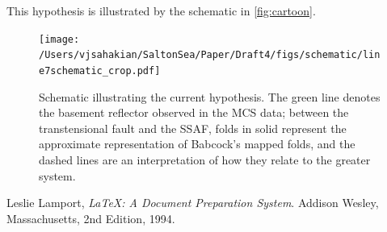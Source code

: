 \documentclass[fontsize=11pt, %
                             paper=a4, %
                             twoside, %
                             captions=tableheading,
                             index=totoc,
                             hyperref]{labbook}
\begin{document}
\begin{addmargin}[4cm]{0cm}
This hypothesis is illustrated by the schematic in \autoref{fig:cartoon}.

\begin{figure}[h!]
\raggedleft
\texttt{[image: /Users/vjsahakian/SaltonSea/Paper/Draft4/figs/schematic/line7schematic\_crop.pdf]}
\caption{Schematic illustrating the current hypothesis.  The green line denotes the basement reflector observed in the MCS data; between the transtensional fault and the SSAF, folds in solid represent the approximate representation of Babcock's mapped folds, and the dashed lines are an interpretation of how they relate to the greater system.}
\label{fig:cartoon}
\end{figure}
 
\end{addmargin}


\begin{thebibliography}{9}

Leslie Lamport,
\emph{\LaTeX: A Document Preparation System}.
Addison Wesley, Massachusetts,
2nd Edition,
1994.

\end{thebibliography}

\end{document}
